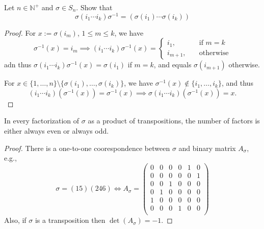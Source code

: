 \begin{proposition}
Let $n\in\mathbb{N}^+$ and $\sigma\in S_n$. Show that
\[
\sigma(i_1\cdots i_k)\sigma^{-1} = (\sigma(i_1)\cdots\sigma(i_k))
\]
\end{proposition}
\begin{proof}
For $x:=\sigma(i_m)$, $1\le m\le k$, we have
\[
\sigma^{-1}(x)=i_m\implies
(i_1\cdots i_k)\sigma^{-1}(x)=\left\{
\begin{aligned}
i_1,&\quad\mbox{if }m=k\\
i_{m+1},&\quad\mbox{otherwise}
\end{aligned}
\right.
\]
adn thus $\sigma(i_1\cdots i_k)\sigma^{-1}(x)=\sigma(i_1)$ if $m=k$, and equals $\sigma(i_{m+1})$ otherwise.

For $x\in\{1,\dots,n\}\setminus\{\sigma(i_1),\dots,\sigma(i_k)\}$, we have $\sigma^{-1}(x)\notin\{i_1,\dots,i_k\}$, and thus
\[
(i_1\cdots i_k)(\sigma^{-1}(x))=\sigma^{-1}(x)\implies
\sigma(i_1\cdots i_k)(\sigma^{-1}(x))=x.
\]
\end{proof}
\begin{proposition}
In every factorization of $\sigma$ as a product of transpositions, the number of factors is either always even or always odd.
\end{proposition}
\begin{proof}
There is a one-to-one coorespondence between $\sigma$ and binary matrix $A_\sigma$, e.g.,
\[
\sigma=(15)(246)
\Leftrightarrow
A_\sigma=\begin{pmatrix}
0&0&0&0&1&0\\
0&0&0&0&0&1\\
0&0&1&0&0&0\\
0&1&0&0&0&0\\
1&0&0&0&0&0\\0&0&0&1&0&0\\
\end{pmatrix}
\]
Also, if $\sigma$ is a transposition then $\det(A_\sigma) = -1$.
\end{proof}

